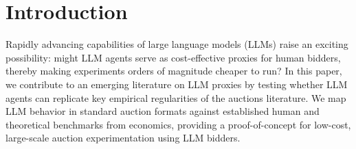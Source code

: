 \documentclass{article} %
\begin{document}
\section{Introduction} \label{sec:introduction}


Rapidly advancing capabilities of large language models (LLMs) raise an exciting possibility: might LLM agents serve as cost-effective proxies for human bidders, thereby making experiments orders of magnitude cheaper to run? In this paper, we contribute to an emerging literature on LLM proxies by testing whether LLM agents can replicate key empirical regularities of the auctions literature. We map LLM behavior in standard auction formats against established human and theoretical benchmarks from economics, providing a proof-of-concept for low-cost, large-scale auction experimentation using LLM bidders.
\end{document}
